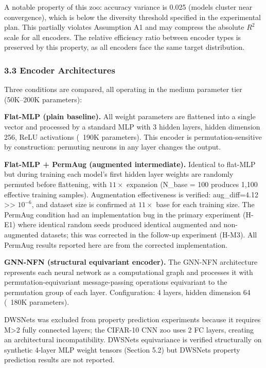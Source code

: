 A notable property of this zoo: accuracy variance is 0.025 (models cluster near convergence), which is below the diversity threshold specified in the experimental plan. This partially violates Assumption A1 and may compress the absolute $R^2$ scale for all encoders. The relative efficiency ratio between encoder types is preserved by this property, as all encoders face the same target distribution.

\subsubsection{3.3 Encoder Architectures}

Three conditions are compared, all operating in the medium parameter tier (50K--200K parameters):

\textbf{Flat-MLP (plain baseline).} All weight parameters are flattened into a single vector and processed by a standard MLP with 3 hidden layers, hidden dimension 256, ReLU activations (~190K parameters). This encoder is permutation-sensitive by construction: permuting neurons in any layer changes the output.

\textbf{Flat-MLP + PermAug (augmented intermediate).} Identical to flat-MLP but during training each model's first hidden layer weights are randomly permuted before flattening, with $11\times$ expansion (N\_base = 100 produces 1,100 effective training samples). Augmentation effectiveness is verified: aug\_diff=4.12 >> $10^{-6}$, and dataset size is confirmed at $11\times$ base for each training size. The PermAug condition had an implementation bug in the primary experiment (H-E1) where identical random seeds produced identical augmented and non-augmented datasets; this was corrected in the follow-up experiment (H-M3). All PermAug results reported here are from the corrected implementation.

\textbf{GNN-NFN (structural equivariant encoder).} The GNN-NFN architecture \citep{Kofinas2024Graph} represents each neural network as a computational graph and processes it with permutation-equivariant message-passing operations equivariant to the permutation group of each layer. Configuration: 4 layers, hidden dimension 64 (~180K parameters).

DWSNets \citep{Navon2023Equivariant} was excluded from property prediction experiments because it requires M>2 fully connected layers; the CIFAR-10 CNN zoo uses 2 FC layers, creating an architectural incompatibility. DWSNets equivariance is verified structurally on synthetic 4-layer MLP weight tensors (Section 5.2) but DWSNets property prediction results are not reported.

